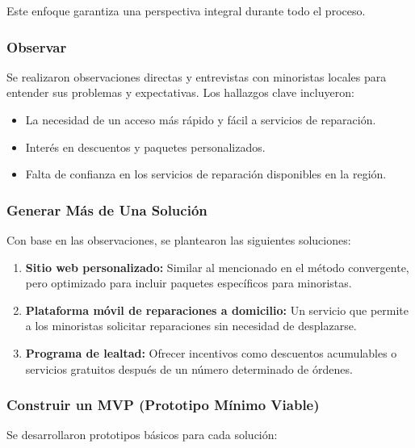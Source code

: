 Este enfoque garantiza una perspectiva integral durante todo el proceso.

\subsubsection{Observar}

Se realizaron observaciones directas y entrevistas con minoristas locales para
entender sus problemas y expectativas. Los hallazgos clave incluyeron:

\begin{itemize}
	\item La necesidad de un acceso más rápido y fácil a servicios de reparación.

	\item Interés en descuentos y paquetes personalizados.

	\item Falta de confianza en los servicios de reparación disponibles en la región.
\end{itemize}

\subsubsection{Generar Más de Una Solución}

Con base en las observaciones, se plantearon las siguientes soluciones:

\begin{enumerate}
	\item \textbf{Sitio web personalizado:} Similar al mencionado en el método
	      convergente, pero optimizado para incluir paquetes específicos para minoristas.

	\item \textbf{Plataforma móvil de reparaciones a domicilio:} Un servicio que
	      permite a los minoristas solicitar reparaciones sin necesidad de desplazarse.

	\item \textbf{Programa de lealtad:} Ofrecer incentivos como descuentos
	      acumulables o servicios gratuitos después de un número determinado de
	      órdenes.
\end{enumerate}

\subsubsection{Construir un MVP (Prototipo Mínimo Viable)}

Se desarrollaron prototipos básicos para cada solución:

